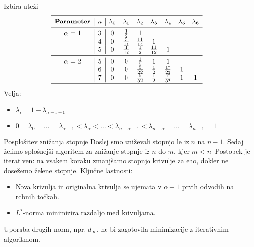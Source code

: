 \documentclass{beamer}
\begin{document}
\begin{frame}{Izbira uteži}
\[
\begin{array}{c|c|ccccccc}
\toprule
\textbf{Parameter} & n & \lambda_0 & \lambda_1 & \lambda_2 & \lambda_3 & \lambda_4 & \lambda_5 & \lambda_6 \\
\midrule
\alpha = 1 & 3 & 0 & \frac{1}{2} & 1 & & & & \\
           & 4 & 0 & \frac{3}{14} & \frac{11}{14} & 1 & & & \\
           & 5 & 0 & \frac{1}{12} & \frac{1}{2} & \frac{11}{12} & 1 & & \\
\midrule
\alpha = 2 & 5 & 0 & 0 & \frac{1}{5} & 1 & 1 & & \\
           & 6 & 0 & 0 & \frac{5}{22} & \frac{1}{2} & \frac{17}{22} & 1 & \\
           & 7 & 0 & 0 & \frac{5}{52} & \frac{1}{2} & \frac{47}{52} & 1 & 1 \\
\bottomrule
\end{array}
\]
Velja: \begin{itemize}
  \item \(\lambda_i = 1 - \lambda_{n-i-1}\)
  \item \(0 = \lambda_0 = \ldots = \lambda_{\alpha-1} < \lambda_\alpha < \ldots < \lambda_{n-\alpha-1} < \lambda_{n-\alpha}\)\(= \ldots = \lambda_{n-1} = 1\)
\end{itemize}
\end{frame}

\begin{frame}{Posplošitev znižanja stopnje}
    Doslej smo zniževali stopnjo le iz \(n\) na \(n-1\). Sedaj želimo splošnejši algoritem za znižanje stopnje iz \(n\) do \(m\), kjer \(m < n\).
    Postopek je iterativen: na vsakem koraku zmanjšamo stopnjo krivulje za eno, dokler ne dosežemo želene stopnje.
    Ključne lastnosti:
        \begin{itemize}
            \item Nova krivulja in originalna krivulja se ujemata v \(\alpha-1\) prvih odvodih na robnih točkah.
            \item \(L^2\)-norma minimizira razdaljo med krivuljama.
        \end{itemize}
    Uporaba drugih norm, npr. \(d_\infty\), ne bi zagotovila minimizacije z iterativnim algoritmom.
\end{frame}
\end{document}
